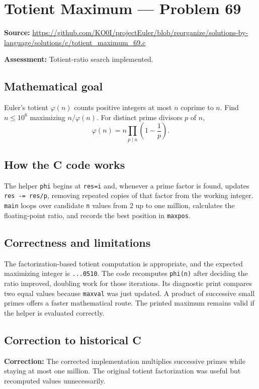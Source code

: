 \section{Totient Maximum --- Problem 69}
\label{prob:69}
\noindent\textbf{Source:} \url{https://github.com/KO0I/projectEuler/blob/reorganize/solutions-by-language/solutions/c/totient_maximum_69.c}

\noindent\textbf{Assessment:} Totient-ratio search implemented.

\subsection*{Mathematical goal}
Euler's totient \(\varphi(n)\) counts positive integers at most \(n\) coprime to \(n\). Find \(n\leq10^6\) maximizing \(n/\varphi(n)\). For distinct prime divisors \(p\) of \(n\),
\[
\varphi(n)=n\prod_{p\mid n}\left(1-\frac1p\right).
\]

\subsection*{How the C code works}
The helper \verb|phi| begins at \verb|res=i| and, whenever a prime factor is found, updates \verb|res -= res/p|, removing repeated copies of that factor from the working integer. \verb|main| loops over candidate \verb|n| values from 2 up to one million, calculates the floating-point ratio, and records the best position in \verb|maxpos|.

\subsection*{Correctness and limitations}
The factorization-based totient computation is appropriate, and the expected maximizing integer is \texttt{...0510}. The code recomputes \verb|phi(n)| after deciding the ratio improved, doubling work for those iterations. Its diagnostic print compares two equal values because \verb|maxval| was just updated. A product of successive small primes offers a faster mathematical route. The printed maximum remains valid if the helper is evaluated correctly.


\subsection*{Correction to historical C}
{\color{red}\textbf{Correction:} The corrected implementation multiplies successive primes while staying at most one million. The original totient factorization was useful but recomputed values unnecessarily.}

